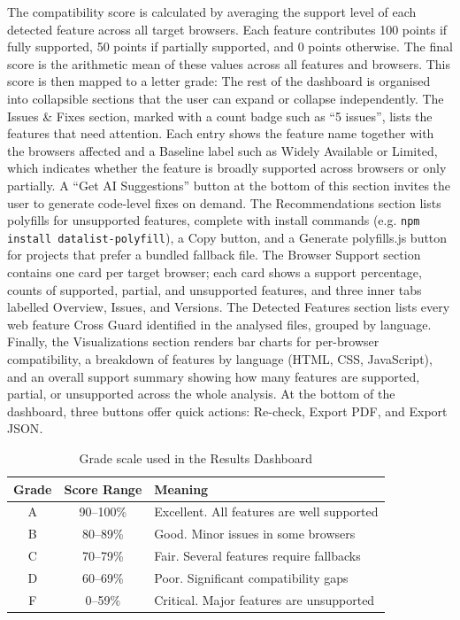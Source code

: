 The compatibility score is calculated by averaging the support level of each detected feature across all target browsers. Each feature contributes 100 points if fully supported, 50 points if partially supported, and 0 points otherwise. The final score is the arithmetic mean of these values across all features and browsers. This score is then mapped to a letter grade:
The rest of the dashboard is organised into collapsible sections that the user can expand or collapse independently. The {Issues \& Fixes} section, marked with a count badge such as ``5 issues'', lists the features that need attention. Each entry shows the feature name together with the browsers affected and a Baseline label such as {Widely Available} or {Limited}, which indicates whether the feature is broadly supported across browsers or only partially. A ``Get AI Suggestions'' button at the bottom of this section invites the user to generate code-level fixes on demand. The {Recommendations} section lists polyfills for unsupported features, complete with install commands (e.g. \texttt{npm install datalist-polyfill}), a {Copy} button, and a {Generate polyfills.js} button for projects that prefer a bundled fallback file. The {Browser Support} section contains one card per target browser; each card shows a support percentage, counts of supported, partial, and unsupported features, and three inner tabs labelled {Overview}, {Issues}, and {Versions}. The {Detected Features} section lists every web feature Cross Guard identified in the analysed files, grouped by language. Finally, the {Visualizations} section renders bar charts for per-browser compatibility, a breakdown of features by language (HTML, CSS, JavaScript), and an overall support summary showing how many features are supported, partial, or unsupported across the whole analysis. At the bottom of the dashboard, three buttons offer quick actions: {Re-check}, {Export PDF}, and {Export JSON}.

\begin{table}[H]
    \centering
    \begin{tabular}{|c|c|l|}
        \hline
        \textbf{Grade} & \textbf{Score Range} & \textbf{Meaning} \\
        \hline \hline
        A & 90--100\% & Excellent. All features are well supported \\ \hline
        B & 80--89\%  & Good. Minor issues in some browsers \\ \hline
        C & 70--79\%  & Fair. Several features require fallbacks \\ \hline
        D & 60--69\%  & Poor. Significant compatibility gaps \\ \hline
        F & 0--59\%   & Critical. Major features are unsupported \\ \hline
    \end{tabular}
    \caption{Grade scale used in the Results Dashboard}
    \label{tab:gui-grades}
\end{table}

